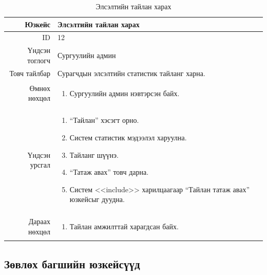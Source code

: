 \begin{longtable}{|r|p{11cm}|}
\caption{Элсэлтийн тайлан харах}
\label{table:usecase12}\\ \hline
Юзкейс & Элсэлтийн тайлан харах \\ \hline
ID & 12 \\ \hline
Үндсэн тоглогч & Сургуулийн админ \\ \hline
Товч тайлбар & Сурагчдын элсэлтийн
статистик тайланг харна. \\ \hline
Өмнөх нөхцөл &
\begin{enumerate}[nosep]
\item Сургуулийн админ нэвтэрсэн байх.
\end{enumerate} \\ \hline
Үндсэн урсгал &
\begin{enumerate}[nosep]
\item ``Тайлан'' хэсэгт орно.
\item Систем статистик мэдээлэл харуулна.
\item Тайланг шүүнэ.
\item ``Татаж авах'' товч дарна.
\item Систем <<include>> харилцаагаар
``Тайлан татаж авах'' юзкейсыг дуудна.
\end{enumerate} \\ \hline
Дараах нөхцөл &
\begin{enumerate}[nosep]
\item Тайлан амжилттай харагдсан байх.
\end{enumerate} \\ \hline
\end{longtable}

\subsection*{Зөвлөх багшийн юзкейсүүд}

